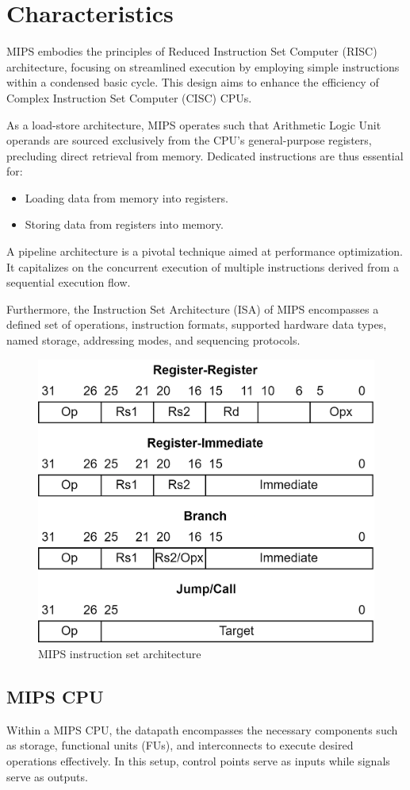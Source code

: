 \section{Characteristics}

MIPS embodies the principles of Reduced Instruction Set Computer (RISC) architecture, focusing on streamlined execution by employing simple instructions within a condensed basic cycle. 
This design aims to enhance the efficiency of Complex Instruction Set Computer (CISC) CPUs.

As a load-store architecture, MIPS operates such that Arithmetic Logic Unit  operands are sourced exclusively from the CPU's general-purpose registers, precluding direct retrieval from memory. 
Dedicated instructions are thus essential for:
\begin{itemize}
    \item Loading data from memory into registers.
    \item Storing data from registers into memory.
\end{itemize}

A pipeline architecture is a pivotal technique aimed at performance optimization. 
It capitalizes on the concurrent execution of multiple instructions derived from a sequential execution flow.

Furthermore, the Instruction Set Architecture (ISA) of MIPS encompasses a defined set of operations, instruction formats, supported hardware data types, named storage, addressing modes, and sequencing protocols.
\begin{figure}[H]
    \centering
    \includegraphics[width=0.4\linewidth]{images/isa.png}
    \caption{MIPS instruction set architecture}
\end{figure}

\subsection{MIPS CPU}
Within a MIPS CPU, the datapath encompasses the necessary components such as storage, functional units (FUs), and interconnects to execute desired operations effectively. 
In this setup, control points serve as inputs while signals serve as outputs.

